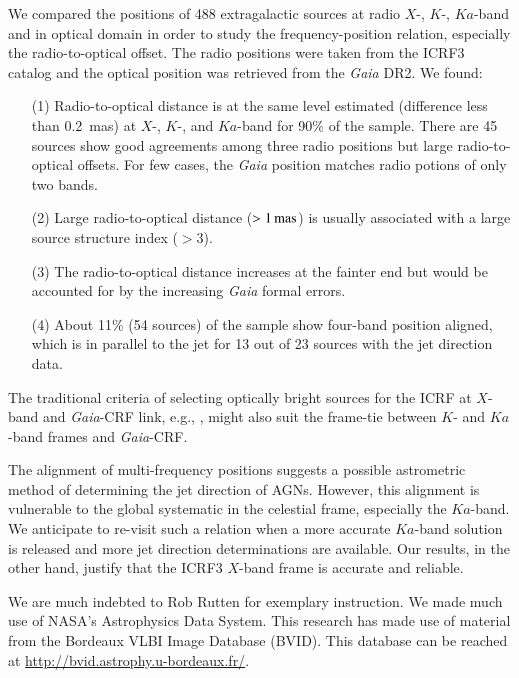 \documentclass{aa-note}   %
\begin{document}
We compared the positions of 488 extragalactic sources at radio $X$-, $K$-, $Ka$-band and in optical domain in order to study the frequency-position relation, especially the radio-to-optical offset.
The radio positions were taken from the ICRF3 catalog and the optical position was retrieved from the \textit{Gaia} DR2.
We found:
%
\begin{enumerate}
    \item[(1)] Radio-to-optical distance is at the same level estimated (difference less than 0.2~mas) at $X$-, $K$-, and $Ka$-band for 90\% of the sample.
    There are 45 sources show good agreements among three radio positions but large radio-to-optical offsets.
    For few cases, the \textit{Gaia} position matches radio potions of only two bands.
    \item[(2)] Large radio-to-optical distance ($>1\,{\rm mas}$) is usually associated with a large source structure index ($>3$).
    \item[(3)] The radio-to-optical distance increases at the fainter end but would be accounted for by the increasing \textit{Gaia} formal errors.
    \item[(4)] About 11\% (54 sources) of the sample show four-band position aligned, which is in parallel to the jet for 13 out of 23 sources with the jet direction data.
\end{enumerate}
%
The traditional criteria of selecting optically bright sources for the ICRF at $X$-band and \textit{Gaia}-CRF link, e.g., \citet{2008A&A...490..403B,2019ApJ...873..132M}, might also suit the frame-tie between $K$- and $Ka$-band frames and \textit{Gaia}-CRF.

The alignment of multi-frequency positions suggests a possible astrometric method of determining the jet direction of AGNs.
However, this alignment is vulnerable to the global systematic in the celestial frame, especially the $Ka$-band.
We anticipate to re-visit such a relation when a more accurate $Ka$-band solution is released and more jet direction determinations are available.
Our results, in the other hand, justify that the ICRF3 $X$-band frame is accurate and reliable.


\begin{acknowledgements}
  We are much indebted to Rob Rutten for exemplary instruction.
  We made much use of NASA's Astrophysics Data System.
  This research has made use of material from the Bordeaux VLBI Image Database (BVID).
  This database can be reached at \url{http://bvid.astrophy.u-bordeaux.fr/}.
\end{acknowledgements}


\end{document}
